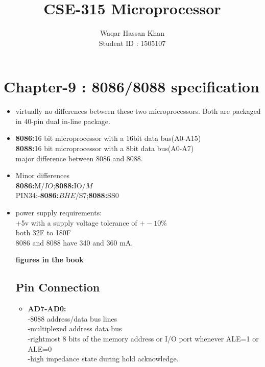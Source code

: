 \documentclass[12pt]{article}
\title{	
	\textbf{CSE-315 Microprocessor}
	\endgraf\bigskip
}
\author{
	\Large{Waqar Hassan Khan}\\
	\Large{Student ID : 1505107}
}
\date{}
\begin{document}
\maketitle

\section{Chapter-9 : 8086/8088 specification}

\begin{itemize}
	\item virtually no differences between these two microprocessors. Both are packaged in 40-pin dual in-line package.
	
	\item\textbf{8086:}16 bit microprocessor with a 16bit data bus(A0-A15)\\
	\textbf{8088:}16 bit microprocessor with a 8bit data bus(A0-A7)\\
	major difference between 8086 and 8088.
	
	\item Minor differences\\
	\textbf{8086:}M/$\overline{IO}$;\textbf{8088:}IO/$\overline{M}$\\
	PIN34:-\textbf{8086:}$\overline{BHE}$/S7;\textbf{8088:}SS0\\
	
	\item power supply requirements:\\
	+5v with a supply voltage tolerance of $+-10\%$\\
	both 32F to 180F\\
	8086 and 8088 have 340 and 360 mA.
	
	\textbf{figures in the book}
	
	\subsection{Pin Connection}
	\begin{itemize}
		\item \textbf{AD7-AD0:}\\
		-8088 address/data bus lines\\
		-multiplexed address data bus\\
		-rightmost 8 bits of the memory address or I/O port whenever ALE=1 or ALE=0\\
		-high impedance state during hold acknowledge.\\
		

\end{itemize}
\end{itemize}
\end{document}
